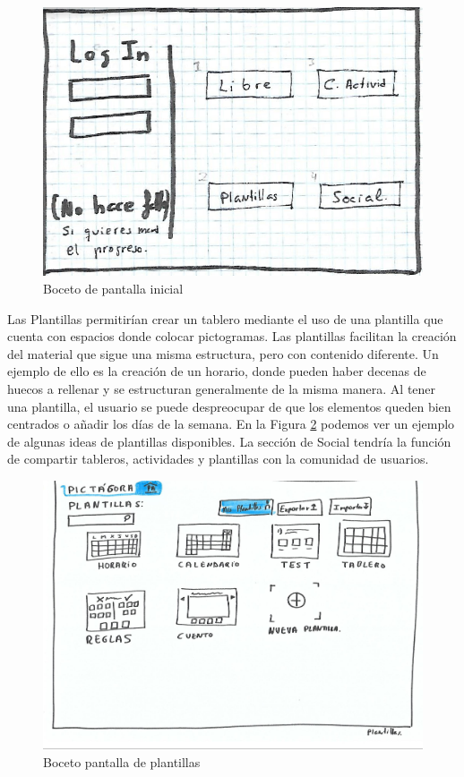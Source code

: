 \begin{figure}[h!]
	\centering
	\includegraphics[width=0.7\linewidth]{Imagenes/Bitmap/logInAlfonso}
	\caption{Boceto de pantalla inicial}
	\label{fig:loginalfonso}
\end{figure}

Las Plantillas permitirían crear un tablero mediante el uso de una plantilla que cuenta con espacios donde colocar pictogramas. Las plantillas facilitan la creación del material que sigue una misma estructura, pero con contenido diferente. Un ejemplo de ello es la creación de un horario, donde pueden haber decenas de huecos a rellenar y se estructuran generalmente de la misma manera. Al tener una plantilla, el usuario se puede despreocupar de que los elementos queden bien centrados o añadir los días de la semana. En la Figura \ref{fig:inicioalfonso} podemos ver un ejemplo de algunas ideas de plantillas disponibles. 
La sección de Social tendría la función de compartir tableros, actividades y plantillas con la comunidad de usuarios.

\begin{figure}[h!]
	\centering
	\includegraphics[width=0.7\linewidth]{Imagenes/Bitmap/inicioAlfonso}
	\caption{Boceto pantalla de plantillas}
	\label{fig:inicioalfonso}
\end{figure}


